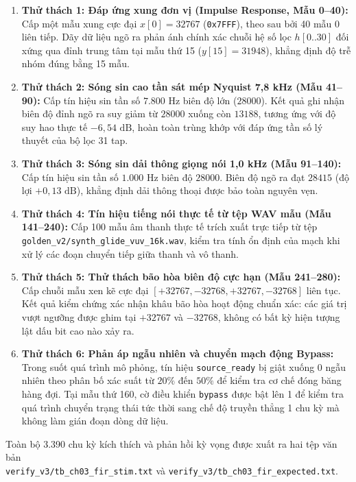 \begin{enumerate}[leftmargin=1.5em, itemsep=2pt]
    \item \textbf{Thử thách 1: Đáp ứng xung đơn vị (Impulse Response, Mẫu 0--40):}
    Cấp một mẫu xung cực đại $x[0] = 32767$ (\texttt{0x7FFF}), theo sau bởi 40 mẫu 0 liên tiếp. Dãy dữ liệu ngõ ra phản ánh chính xác chuỗi hệ số lọc $h[0..30]$ đối xứng qua đỉnh trung tâm tại mẫu thứ 15 ($y[15] = 31948$), khẳng định độ trễ nhóm đúng bằng 15 mẫu.
    \item \textbf{Thử thách 2: Sóng sin cao tần sát mép Nyquist 7,8 kHz (Mẫu 41--90):}
    Cấp tín hiệu sin tần số $7.800\text{ Hz}$ biên độ lớn ($28000$). Kết quả ghi nhận biên độ đỉnh ngõ ra suy giảm từ $28000$ xuống còn $13188$, tương ứng với độ suy hao thực tế $-6{,}54\text{ dB}$, hoàn toàn trùng khớp với đáp ứng tần số lý thuyết của bộ lọc 31 tap.
    \item \textbf{Thử thách 3: Sóng sin dải thông giọng nói 1,0 kHz (Mẫu 91--140):}
    Cấp tín hiệu sin tần số $1.000\text{ Hz}$ biên độ $28000$. Biên độ ngõ ra đạt $28415$ (độ lợi $+0{,}13\text{ dB}$), khẳng định dải thông thoại được bảo toàn nguyên vẹn.
    \item \textbf{Thử thách 4: Tín hiệu tiếng nói thực tế từ tệp WAV mẫu (Mẫu 141--240):}
    Cấp 100 mẫu âm thanh thực tế trích xuất trực tiếp từ tệp \texttt{golden\_v2/synth\_glide\_vuv\_16k.wav}, kiểm tra tính ổn định của mạch khi xử lý các đoạn chuyển tiếp giữa thanh và vô thanh.
    \item \textbf{Thử thách 5: Thử thách bão hòa biên độ cực hạn (Mẫu 241--280):}
    Cấp chuỗi mẫu xen kẽ cực đại $[+32767, -32768, +32767, -32768]$ liên tục. Kết quả kiểm chứng xác nhận khâu bão hòa hoạt động chuẩn xác: các giá trị vượt ngưỡng được ghim tại $+32767$ và $-32768$, không có bất kỳ hiện tượng lật dấu bit cao nào xảy ra.
    \item \textbf{Thử thách 6: Phản áp ngẫu nhiên và chuyển mạch động Bypass:}
    Trong suốt quá trình mô phỏng, tín hiệu \texttt{source\_ready} bị giật xuống 0 ngẫu nhiên theo phân bố xác suất từ $20\%$ đến $50\%$ để kiểm tra cơ chế đóng băng hàng đợi. Tại mẫu thứ 160, cờ điều khiển \texttt{bypass} được bật lên 1 để kiểm tra quá trình chuyển trạng thái tức thời sang chế độ truyền thẳng 1 chu kỳ mà không làm gián đoạn dòng dữ liệu.
\end{enumerate}

Toàn bộ 3.390 chu kỳ kích thích và phản hồi kỳ vọng được xuất ra hai tệp văn bản\\ \texttt{verify\_v3/tb\_ch03\_fir\_stim.txt} và \texttt{verify\_v3/tb\_ch03\_fir\_expected.txt}.

